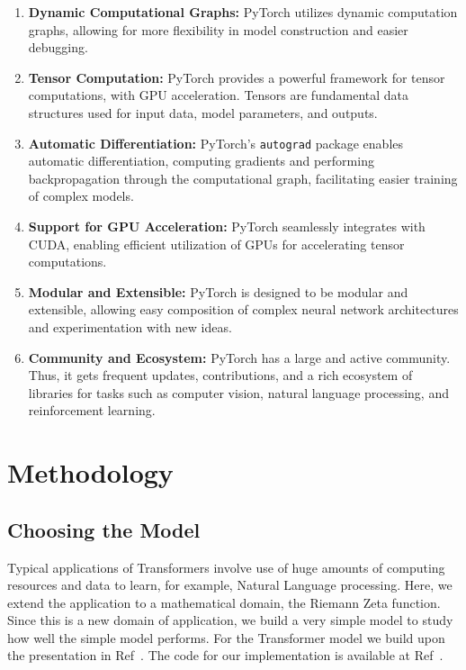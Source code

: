 \documentclass[journal]{IEEEtai}
\begin{document}
\begin{enumerate}
    \item \textbf{Dynamic Computational Graphs:} PyTorch utilizes dynamic computation graphs, allowing for more flexibility in model construction and easier debugging.
    
    \item \textbf{Tensor Computation:} PyTorch provides a powerful framework for tensor computations,  with GPU acceleration. Tensors are fundamental data structures used for input data, model parameters, and outputs.
    
    \item \textbf{Automatic Differentiation:} PyTorch's \texttt{autograd} package enables automatic differentiation, computing gradients and performing backpropagation through the computational graph, facilitating easier training of complex models.
    
    \item \textbf{Support for GPU Acceleration:} PyTorch seamlessly integrates with CUDA, enabling efficient utilization of GPUs for accelerating tensor computations.
    
    \item \textbf{Modular and Extensible:} PyTorch is designed to be modular and extensible, allowing easy composition of complex neural network architectures and experimentation with new ideas.
    
    \item \textbf{Community and Ecosystem:} PyTorch has a large and active community. Thus, it gets frequent updates, contributions, and a rich ecosystem of libraries for tasks such as computer vision, natural language processing, and reinforcement learning.
\end{enumerate}


\section{Methodology}


\subsection{\label{sec3.1} Choosing the Model}
Typical applications of Transformers involve use of huge amounts of computing resources and data to learn, for example, Natural Language processing. Here, we extend the application to a mathematical domain, the Riemann Zeta function. Since this is a new domain of application, we build a very simple model to study how well the simple model performs. For the Transformer model we build upon the presentation in  Ref~\cite{BenjaminEtienne}. The code for our implementation is available at 
 Ref~\cite{shankergit}.
\end{document}
